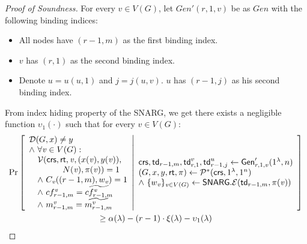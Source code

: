 \begin{proof}[Proof of Soundness]
For every $v\in V(G)$, let $Gen'(r,1,v)$ be as $Gen$ with the following binding indices:
\begin{itemize}
    \item All nodes have $(r-1,m)$ as the first binding index.
    \item $v$ has $(r,1)$ as the second binding index.
    \item Denote $u = u(u,1)$ and $j = j(u,v)$. $u$ has $(r-1, j)$ as his second binding index. 
\end{itemize}
From index hiding property of the SNARG, we get there exists a negligible function $\upsilon_1(\cdot)$ such that for every $v\in V(G)$:
\begin{gather*}
    \Pr \left[ \begin{array}{ll} 
    \mathcal{D}(G, x)\neq y  \\
    \wedge\ \forall \mathit{ v }\in V(G) : \\
    \quad \mathcal{V}(\mathsf{crs}, \mathsf{rt}, \mathit{ v }, (x(\mathit{ v }), y(\mathit{ v })),\\
    \qquad \qquad N(\mathit{ v }), \pi(\mathit{ v })) = 1 \\
    \quad \wedge ~C_{\mathit{ v }}((r-1, m), w_{\mathit{ v }}) = 1 \\
    \quad \wedge ~cf^{\mathit{ v }}_{r-1, m} = \widetilde{cf^{\mathit{ v }}_{r-1,m}} \\
    \quad \wedge ~m^{\mathit{ v }}_{r-1,m} = \widetilde{m^{\mathit{ v }}_{r-1,m}}
     \end{array} \middle\vert \begin{array}{ll} 
    \mathsf{crs}, \mathsf{td}_{r-1,m}, \mathsf{td}^v_{r,1}, \mathsf{td}^{u}_{r-1, j}\leftarrow \mathsf{Gen}'_{r,1,v}(1^\lambda, n) \\
    (G, x, y, \mathsf{rt}, \pi) \leftarrow \mathcal{P}^*(\mathsf{crs}, 1^\lambda, 1^n)\\
    \wedge ~\{w_{\mathit{ v }}\}_{\mathit{ v }\in V(G)}\leftarrow \mathsf{SNARG}.\mathcal{E}(\mathsf{td}_{r-1,m}, \pi(\mathit{ v }))
     \end{array} \right]\\
    \geq \alpha(\lambda) - (r-1)\cdot\xi(\lambda) -\upsilon_1(\lambda)
\end{gather*}


\end{proof}
